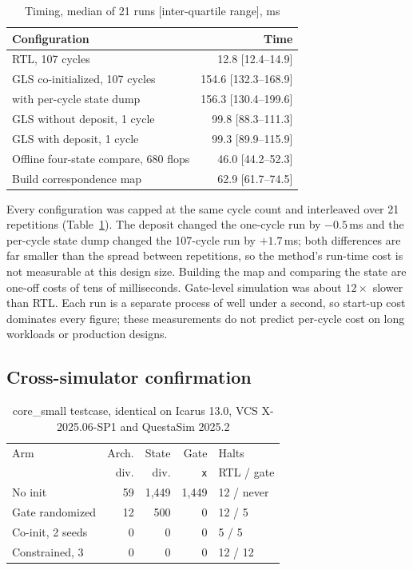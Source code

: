 \documentclass[journal]{IEEEtran}
\newcommand{\X}{\texttt{x}}
\begin{document}
\begin{table}[!t]
\caption{Timing, median of 21 runs [inter-quartile range], ms}
\label{tab:time}
\centering\footnotesize
\begin{tabular}{lr}
\toprule
Configuration & Time \\
\midrule
RTL, 107 cycles                         & 12.8 [12.4--14.9] \\
GLS co-initialized, 107 cycles          & 154.6 [132.3--168.9] \\
\quad with per-cycle state dump         & 156.3 [130.4--199.6] \\
GLS without deposit, 1 cycle            & 99.8 [88.3--111.3] \\
GLS with deposit, 1 cycle               & 99.3 [89.9--115.9] \\
Offline four-state compare, 680 flops   & 46.0 [44.2--52.3] \\
Build correspondence map                & 62.9 [61.7--74.5] \\
\bottomrule
\end{tabular}
\end{table}

Every configuration was capped at the same cycle count and interleaved over 21
repetitions (Table~\ref{tab:time}). The deposit changed the one-cycle run by
$-0.5$\,ms and the per-cycle state dump changed the 107-cycle run by $+1.7$\,ms;
both differences are far smaller than the spread between repetitions, so the
method's run-time cost is not measurable at this design size. Building the map and
comparing the state are one-off costs of tens of milliseconds. Gate-level
simulation was about $12\times$ slower than RTL. Each run is a separate process of
well under a second, so start-up cost dominates every figure; these measurements do
not predict per-cycle cost on long workloads or production designs.

\subsection{Cross-simulator confirmation}

\begin{table}[!t]
\caption{core\_small testcase, identical on Icarus 13.0, VCS X-2025.06-SP1 and
QuestaSim 2025.2}
\label{tab:xsim}
\centering\footnotesize
\begin{tabular}{lrrrl}
\toprule
Arm & Arch. & State & Gate & Halts \\
    & div.  & div.  & \X   & RTL / gate \\
\midrule
No init           & 59 & 1{,}449 & 1{,}449 & 12 / never \\
Gate randomized   & 12 & 500     & 0       & 12 / 5 \\
Co-init, 2 seeds  & 0  & 0       & 0       & 5 / 5 \\
Constrained, 3    & 0  & 0       & 0       & 12 / 12 \\
\bottomrule
\end{tabular}
\end{table}
\end{document}
